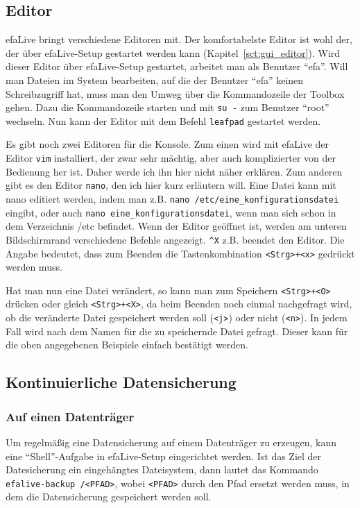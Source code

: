 \documentclass[a4paper,12pt,twoside]{article}
\begin{document}
\subsection{Editor}
\label{sct:editor}
efaLive bringt verschiedene Editoren
mit. Der komfortabelste Editor ist wohl der, der über efaLive-Setup
gestartet werden kann (Kapitel~\ref{sct:gui_editor}).
Wird dieser Editor über efaLive-Setup gestartet, arbeitet man als
Benutzer "`efa"'. Will man Dateien im System
bearbeiten, auf die der Benutzer "`efa"'
keinen Schreibzugriff hat, muss man den Umweg über die Kommandozeile
der Toolbox gehen. Dazu die Kommandozeile starten und mit
\texttt{su -} zum Benutzer
"`root"' wechseln. Nun kann der Editor mit
dem Befehl \texttt{leafpad} gestartet werden.

Es gibt noch zwei Editoren für die Konsole. Zum einen wird mit efaLive
der Editor \texttt{vim} installiert, der zwar sehr
mächtig, aber auch komplizierter von der Bedienung her ist. Daher werde
ich ihn hier nicht näher erklären. Zum anderen gibt es den Editor
\texttt{nano}, den ich hier kurz erläutern will.
Eine Datei kann mit nano editiert werden, indem man z.B.
\texttt{nano /etc/eine\_konfigurationsdatei}
eingibt, oder auch \texttt{nano eine\_konfigurationsdatei},
wenn man sich schon in dem Verzeichnis /etc befindet. Wenn
der Editor geöffnet ist, werden am unteren Bildschirmrand verschiedene
Befehle angezeigt. \texttt{\^{}X} z.B. beendet den
Editor. Die Angabe bedeutet, dass zum Beenden die Tastenkombination
\texttt{{\textless}Strg{\textgreater}+{\textless}x{\textgreater}} gedrückt
werden muss.

Hat man nun eine Datei verändert, so kann man zum Speichern
\texttt{{\textless}Strg{\textgreater}+{\textless}O{\textgreater}} drücken oder
gleich \texttt{{\textless}Strg{\textgreater}+{\textless}X{\textgreater}}, da
beim Beenden noch einmal nachgefragt wird, ob die veränderte Datei
gespeichert werden soll (\texttt{{\textless}j{\textgreater}}) oder nicht
(\texttt{{\textless}n{\textgreater}}). In jedem Fall wird nach dem Namen für die
zu speichernde Datei gefragt. Dieser kann für die oben angegebenen
Beispiele einfach bestätigt werden.


\subsection{Kontinuierliche Datensicherung}
\label{sct:kont_backup}
\subsubsection{Auf einen Datenträger}
\label{sct:cont_device}
Um regelmäßig eine Datensicherung auf einem Datenträger zu erzeugen, 
kann eine "`Shell"'-Aufgabe in efaLive-Setup eingerichtet werden. Ist 
das Ziel der Datesicherung ein eingehängtes Dateisystem, dann lautet 
das Kommando \texttt{efalive-backup /{\textless}PFAD{\textgreater}}, wobei 
\texttt{{\textless}PFAD{\textgreater}} durch den Pfad ersetzt werden muss, in dem die 
Datensicherung gespeichert werden soll.
\end{document}
